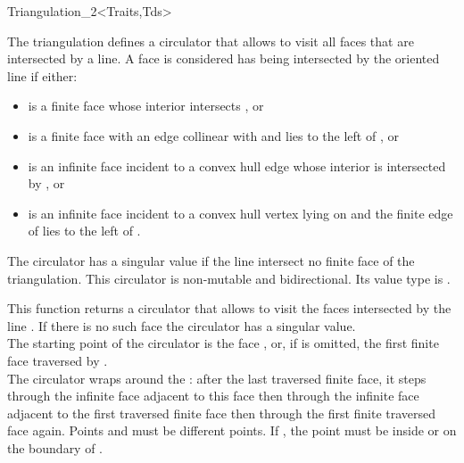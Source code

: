\begin{ccRefClass}{Triangulation_2<Traits,Tds>}
\ccGlue
{}

\ccGlue
{}


The triangulation defines a circulator that allows
to visit all faces that are intersected by a line. 
A  face   is 
considered has being intersected by 
 the oriented line  if either:
\begin{itemize}\ccTexHtml{\itemsep0pt}{}
\item 
{} is a finite face whose interior intersects , or
\item
  is a finite face with  an edge collinear with  and lies
to the left of , or
\item
{} is an infinite face incident to a  convex hull edge 
whose interior is intersected
by , or
\item
{} is an infinite face incident to a  convex hull vertex
lying on   and the finite edge of 
lies to the left of . 
\end{itemize}
The circulator has a singular value if  the line 
intersect no finite face of the triangulation.
This circulator is
non-mutable and bidirectional. Its value type is .

{ This function returns a circulator that allows to visit the 
 faces intersected by the line . 
If there is no such face the circulator has a singular value.\\
 The starting point of the circulator is the face , or, if
  is omitted,  the first finite face traversed by . \\
  The circulator wraps around the  :
after the last traversed finite face, it steps through the infinite face adjacent
to this face then through the infinite face adjacent to the first
traversed finite face then through the first finite traversed face
again.
\ccPrecond Points  and  must be different points.
\ccPrecond If , the point  must be
inside or on the boundary of .}


\end{ccRefClass}
